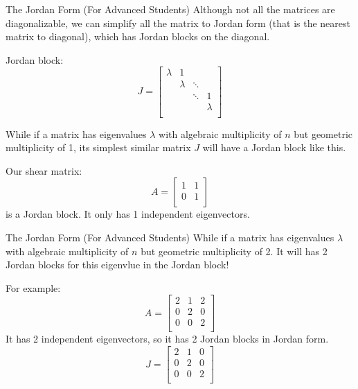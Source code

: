 \documentclass{beamer}
\begin{document}
\begin{frame}{The Jordan Form (For Advanced Students)}
    Although not all the matrices are diagonalizable, we can simplify all the matrix to Jordan form (that is the nearest matrix to diagonal), which has Jordan blocks on the diagonal.

    \vspace{3pt}
    Jordan block:
    \begin{equation*}
        J=\left[ \begin{matrix}
            \lambda&		1&		&		\\
            &		\lambda&		\ddots&		\\
            &		&		\ddots&		1\\
            &		&		&		\lambda\\
        \end{matrix} \right]
    \end{equation*}

    While if a matrix has eigenvalues $\lambda$ with algebraic multiplicity of $n$ but geometric multiplicity of 1, its simplest similar matrix $J$ will have a Jordan block like this.

    \vspace{3pt}
    Our shear matrix:
    \begin{equation*}
        A=\left[ \begin{matrix}
            1&		1\\
            0&		1\\
        \end{matrix} \right]
    \end{equation*}
    is a Jordan block. It only has 1 independent eigenvectors.
\end{frame}

\begin{frame}{The Jordan Form (For Advanced Students)}
    While if a matrix has eigenvalues $\lambda$ with algebraic multiplicity of $n$ but geometric multiplicity of 2. It will has 2 Jordan blocks for this eigenvlue in the Jordan block!

    \vspace{3pt}
    For example:
    \begin{equation*}
        A=\left[ \begin{matrix}
            2&		1&		2\\
            0&		2&		0\\
            0&		0&		2\\
        \end{matrix} \right]
    \end{equation*}
    It has 2 independent eigenvectors, so it has 2 Jordan blocks in Jordan form.
    \begin{equation*}
        J=\left[ \begin{matrix}
            2&		1&		0\\
            0&		2&		0\\
            0&		0&		2\\
        \end{matrix} \right]
    \end{equation*}

\end{frame}
\end{document}
